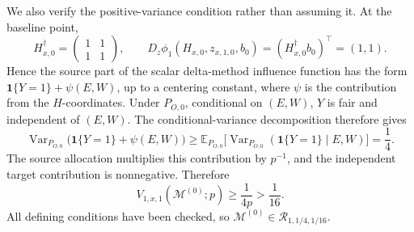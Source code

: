We also verify the positive-variance condition rather than assuming it.  At the baseline point,
\[
H_{x,0}^{\dagger}=
\begin{pmatrix}1&1\\1&1\end{pmatrix},
\qquad
D_z\phi_1(H_{x,0},z_{x,1,0},b_0)
=(H_{x,0}^{\dagger}b_0)^{\top}=(1,1).
\]
Hence the source part of the scalar delta-method influence function has the form
\(\mathbf 1\{Y=1\}+\psi(E,W)\), up to a centering constant, where \(\psi\) is the contribution from the \(H\)-coordinates.  Under \(P_{O,0}\), conditional on \((E,W)\), \(Y\) is fair and independent of \((E,W)\).  The conditional-variance decomposition therefore gives
\[
\operatorname{Var}_{P_{O,0}}
 \bigl(\mathbf 1\{Y=1\}+\psi(E,W)\bigr)
\ge
\mathbb E_{P_{O,0}}
 \bigl[\operatorname{Var}_{P_{O,0}}(\mathbf 1\{Y=1\}\mid E,W)\bigr]
=\frac14.
\]
The source allocation multiplies this contribution by \(p^{-1}\), and the independent target contribution is nonnegative.  Therefore
\[
V_{1,x,1}(\mathcal M^{(0)};p)\ge\frac1{4p}>\frac1{16}.
\]
All defining conditions have been checked, so
\(\mathcal M^{(0)}\in\mathcal R_{1,1/4,1/16}\).

